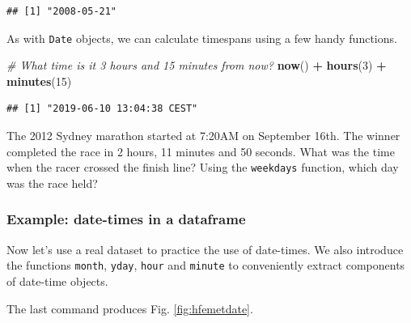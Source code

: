 \documentclass[]{book}
\newenvironment{Shaded}{\begin{snugshade}}{\end{snugshade}}
\newcommand{\CommentTok}[1]{\textcolor[rgb]{0.56,0.35,0.01}{\textit{#1}}}
\newcommand{\DecValTok}[1]{\textcolor[rgb]{0.00,0.00,0.81}{#1}}
\newcommand{\KeywordTok}[1]{\textcolor[rgb]{0.13,0.29,0.53}{\textbf{#1}}}
\newcommand{\NormalTok}[1]{#1}
\newcommand{\OperatorTok}[1]{\textcolor[rgb]{0.81,0.36,0.00}{\textbf{#1}}}
\newcommand{\StringTok}[1]{\textcolor[rgb]{0.31,0.60,0.02}{#1}}
\let\BeginKnitrBlock\begin \let\EndKnitrBlock\end
\begin{document}
\begin{verbatim}
## [1] "2008-05-21"
\end{verbatim}

As with \texttt{Date} objects, we can calculate timespans using a few handy functions.

\begin{Shaded}
\begin{Highlighting}[]
\CommentTok{# What time is it 3 hours and 15 minutes from now?}
\KeywordTok{now}\NormalTok{() }\OperatorTok{+}\StringTok{ }\KeywordTok{hours}\NormalTok{(}\DecValTok{3}\NormalTok{) }\OperatorTok{+}\StringTok{ }\KeywordTok{minutes}\NormalTok{(}\DecValTok{15}\NormalTok{)}
\end{Highlighting}
\end{Shaded}

\begin{verbatim}
## [1] "2019-06-10 13:04:38 CEST"
\end{verbatim}

\BeginKnitrBlock{rmdtry}
The 2012 Sydney marathon started at 7:20AM on September 16th. The winner completed the race in 2 hours, 11 minutes and 50 seconds. What was the time when the racer crossed the finish line? Using the \texttt{weekdays} function, which day was the race held?
\EndKnitrBlock{rmdtry}

\hypertarget{example-date-times-in-a-dataframe}{%
\subsubsection{Example: date-times in a dataframe}\label{example-date-times-in-a-dataframe}}

Now let's use a real dataset to practice the use of date-times. We also introduce the functions \texttt{month}, \texttt{yday}, \texttt{hour} and \texttt{minute} to conveniently extract components of date-time objects.

The last command produces Fig. \ref{fig:hfemetdate}.
\end{document}
